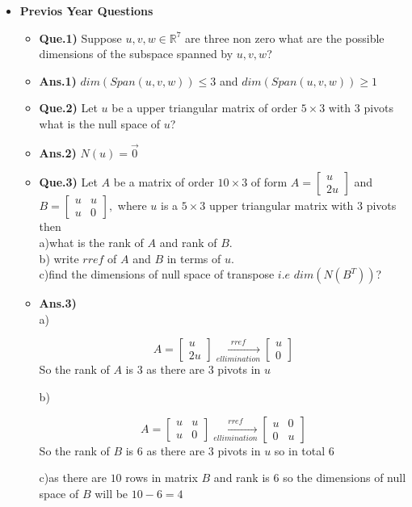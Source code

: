 \documentclass[a4paper,11pt]{article}
\numberwithin{equation}{section}
\begin{document}
\begin{itemize}
\item \textbf{Previos Year Questions }
\begin{itemize}
    \item \textbf{Que.1)} Suppose $u,v,w\in \mathbb{R}^7$ are three non zero what are the possible dimensions of the subspace spanned by $u,v,w$?
    \item \textbf{Ans.1)} $dim(Span(u,v,w))\leq 3$ and $dim(Span(u,v,w))\geq 1$\\
    \item \textbf{Que.2)} Let $u$ be a upper triangular matrix of order $5\times 3$ with $3$ pivots what is the null space of $u$?
    \item \textbf{Ans.2)} $N(u)={\vec{0}}$\\
    \item \textbf{Que.3)} Let $A$ be a matrix of order $10\times 3$ of form $A=\begin{bmatrix} u\\2u \end{bmatrix}$ and $B=\begin{bmatrix} u&u\\u&0 \end{bmatrix},$ where $u$ is a $5\times 3$ upper triangular matrix with $3$ pivots then\\
    a)what is the rank of $A$ and rank of $B$.\\
    b) write $rref$ of $A$ and $B$ in terms of $u$.\\
    c)find the dimensions of null space of transpose $i.e$ $dim(N(B^T))$?
    \item \textbf{Ans.3)}\\
    a)\begin{center}
        \[A=
        \begin{bmatrix}
            u\\2u
        \end{bmatrix} \xrightarrow[ellimination]{rref}
        \begin{bmatrix}
            u\\0
        \end{bmatrix}
        \]
    So the rank of $A$ is $3$ as there are $3$ pivots in $u$\\
    \end{center}
    b)\begin{center}
        \[A=
        \begin{bmatrix}
            u&u\\u&0
        \end{bmatrix} \xrightarrow[ellimination]{rref}
        \begin{bmatrix}
            u&0\\0&u
        \end{bmatrix}
        \]
    So the rank of $B$ is $6$ as there are $3$ pivots in $u$ so in total $6$\\
    \end{center}
    c)as there are $10$ rows in matrix $B$ and rank is $6$ so the dimensions of null space of $B$ will be $10-6=4$\\


\end{itemize}
\end{itemize}
\end{document}
